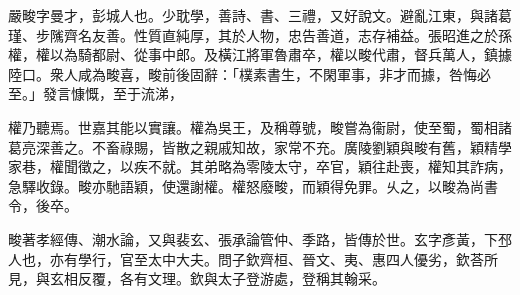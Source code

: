 \begin{pinyinscope}
 
 
 嚴畯字曼才，彭城人也。少耽學，善詩、書、三禮，又好說文。避亂江東，與諸葛瑾、步隲齊名友善。性質直純厚，其於人物，忠告善道，志存補益。張昭進之於孫權，權以為騎都尉、從事中郎。及橫江將軍魯肅卒，權以畯代肅，督兵萬人，鎮據陸口。衆人咸為畯喜，畯前後固辭：「樸素書生，不閑軍事，非才而據，咎悔必至。」發言慷慨，至于流涕，
 
 
 權乃聽焉。世嘉其能以實讓。權為吳王，及稱尊號，畯嘗為衞尉，使至蜀，蜀相諸葛亮深善之。不畜祿賜，皆散之親戚知故，家常不充。廣陵劉穎與畯有舊，穎精學家巷，權聞徵之，以疾不就。其弟略為零陵太守，卒官，穎往赴喪，權知其詐病，急驛收錄。畯亦馳語穎，使還謝權。權怒廢畯，而穎得免罪。乆之，以畯為尚書令，後卒。
 
 
 
 
 畯著孝經傳、潮水論，又與裴玄、張承論管仲、季路，皆傳於世。玄字彥黃，下邳人也，亦有學行，官至太中大夫。問子欽齊桓、晉文、夷、惠四人優劣，欽荅所見，與玄相反覆，各有文理。欽與太子登游處，登稱其翰采。
 
 
\end{pinyinscope}